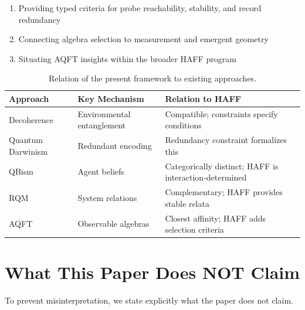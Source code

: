 \documentclass[12pt,a4paper]{article}
\begin{document}
\begin{enumerate}
    \item Providing typed criteria for probe reachability, stability, and record redundancy
    \item Connecting algebra selection to measurement and emergent geometry
    \item Situating AQFT insights within the broader HAFF program
\end{enumerate}

\begin{table}[ht]
\centering
\small
\begin{tabular}{|P{3cm}|P{4cm}|P{5.5cm}|}
\hline
\textbf{Approach} & \textbf{Key Mechanism} & \textbf{Relation to HAFF} \\
\hline
Decoherence & Environmental entanglement & Compatible; constraints specify conditions \\
\hline
Quantum Darwinism & Redundant encoding & Redundancy constraint formalizes this \\
\hline
QBism & Agent beliefs & Categorically distinct; HAFF is interaction-determined \\
\hline
RQM & System relations & Complementary; HAFF provides stable relata \\
\hline
AQFT & Observable algebras & Closest affinity; HAFF adds selection criteria \\
\hline
\end{tabular}
\caption{Relation of the present framework to existing approaches.}
\label{tab:relations}
\end{table}

\section{What This Paper Does NOT Claim}
\label{sec:nonclaims}

To prevent misinterpretation, we state explicitly what the paper does not claim.
\end{document}
